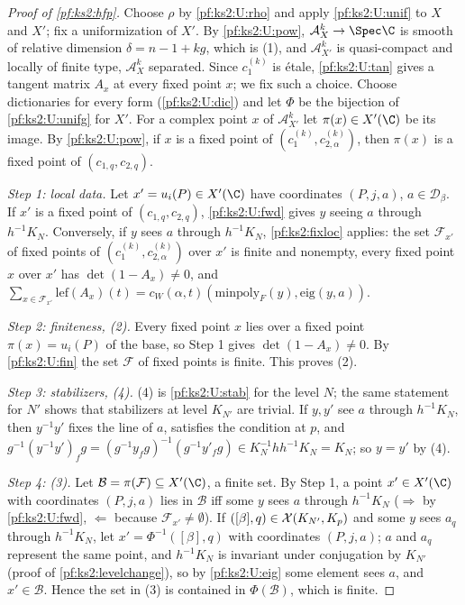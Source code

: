 \begin{proof}[Proof of \cref{pf:ks2:hfp}]
Choose $\rho$ by
\ref{pf:ks2:U:rho} and apply \ref{pf:ks2:U:unif} to $X$ and $X'$; fix a uniformization of $X'$. By
\ref{pf:ks2:U:pow}, $\mathcal A_X^k\to\Spec\C$ is smooth of relative dimension $\delta=n-1+kg$, which is
(1), and $\mathcal A_{X'}^k$ is quasi-compact and locally of finite type, $\mathcal A_X^k$ separated.
Since $c_1^{(k)}$ is \'etale, \ref{pf:ks2:U:tan} gives a tangent matrix $A_x$ at every fixed point $x$; we
fix such a choice. Choose dictionaries for every form (\ref{pf:ks2:U:dic}) and let $\Phi$ be the bijection
of \ref{pf:ks2:U:unifg} for $X'$. For a complex point $x$ of $\mathcal A_{X'}^k$ let $\pi(x)\in X'(\C)$ be
its image. By \ref{pf:ks2:U:pow}, if $x$ is a fixed point of $(c_1^{(k)},c_{2,\alpha}^{(k)})$, then
$\pi(x)$ is a fixed point of $(c_{1,q},c_{2,q})$.

\emph{Step 1: local data.} Let $x'=u_i(P)\in X'(\C)$ have coordinates $(P,j,a)$, $a\in\mathcal{D}_\beta$. If
$x'$ is a fixed point of $(c_{1,q},c_{2,q})$, \ref{pf:ks2:U:fwd} gives $y$ seeing $a$ through $h^{-1}K_N$.
Conversely, if $y$ sees $a$ through $h^{-1}K_N$, \cref{pf:ks2:fixloc} applies: the set $\mathcal F_{x'}$ of
fixed points of $(c_1^{(k)},c_{2,\alpha}^{(k)})$ over $x'$ is finite and nonempty, every fixed point $x$ over
$x'$ has $\det(1-A_x)\ne0$, and
$\sum_{x\in\mathcal F_{x'}}\mathrm{lef}(A_x)(t)=c_W(\alpha,t)(\mathrm{minpoly}_F(y),\mathrm{eig}(y,a))$.

\emph{Step 2: finiteness, (2).} Every fixed point $x$ lies over a fixed point $\pi(x)=u_i(P)$ of the base,
so Step 1 gives $\det(1-A_x)\ne0$. By \ref{pf:ks2:U:fin} the set $\mathcal F$ of fixed points is finite.
This proves (2).

\emph{Step 3: stabilizers, (4).} (4) is \ref{pf:ks2:U:stab} for the level $N$; the same statement for
$N'$ shows that stabilizers at level $K_{N'}$ are trivial. If $y,y'$ see $a$ through $h^{-1}K_N$, then
$y^{-1}y'$ fixes the line of $a$, satisfies the condition at $p$, and $g^{-1}(y^{-1}y')_fg=(g^{-1}y_fg)^{-1}
(g^{-1}y'_fg)\in K_N^{-1}hh^{-1}K_N=K_N$; so $y=y'$ by (4).

\emph{Step 4: (3).} Let $\mathcal B=\pi(\mathcal F)\subseteq X'(\C)$, a finite set. By Step 1, a point
$x'\in X'(\C)$ with coordinates $(P,j,a)$ lies in $\mathcal B$ iff some $y$ sees $a$ through $h^{-1}K_N$
($\Rightarrow$ by \ref{pf:ks2:U:fwd}, $\Leftarrow$ because $\mathcal F_{x'}\ne\emptyset$). If
$([\beta],q)\in\mathcal{X}(K_{N'},K_{p})$ and some $y$ sees $a_q$ through $h^{-1}K_N$, let
$x'=\Phi^{-1}([\beta],q)$ with coordinates $(P,j,a)$; $a$ and $a_q$ represent the same point, and
$h^{-1}K_N$ is invariant under conjugation by $K_{N'}$ (proof of \cref{pf:ks2:levelchange}), so by
\ref{pf:ks2:U:eig} some element sees $a$, and $x'\in\mathcal B$. Hence the set in (3) is contained in
$\Phi(\mathcal B)$, which is finite.


\end{proof}

